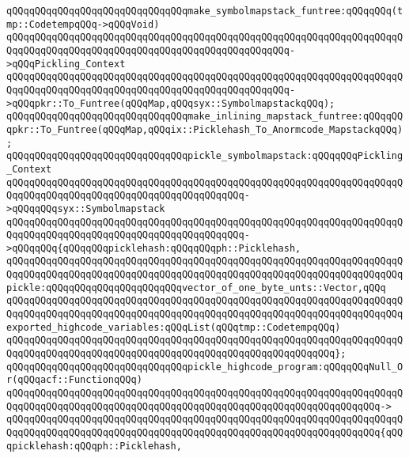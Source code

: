 \verb|qQQqqQQqqQQqqQQqqQQqqQQqqQQqqQQqmake_symbolmapstack_funtree:qQQqqQQq(tmp::CodetempqQQq->qQQqVoid)|\newline
\verb|qQQqqQQqqQQqqQQqqQQqqQQqqQQqqQQqqQQqqQQqqQQqqQQqqQQqqQQqqQQqqQQqqQQqqQQqqQQqqQQqqQQqqQQqqQQqqQQqqQQqqQQqqQQqqQQqqQQqqQQq->qQQqPickling_Context|\newline
\verb|qQQqqQQqqQQqqQQqqQQqqQQqqQQqqQQqqQQqqQQqqQQqqQQqqQQqqQQqqQQqqQQqqQQqqQQqqQQqqQQqqQQqqQQqqQQqqQQqqQQqqQQqqQQqqQQqqQQqqQQq->qQQqpkr::To_Funtree(qQQqMap,qQQqsyx::SymbolmapstackqQQq);|\newline
\newline
\verb|qQQqqQQqqQQqqQQqqQQqqQQqqQQqqQQqmake_inlining_mapstack_funtree:qQQqqQQqpkr::To_Funtree(qQQqMap,qQQqix::Picklehash_To_Anormcode_MapstackqQQq);|\newline
\newline
\verb|qQQqqQQqqQQqqQQqqQQqqQQqqQQqqQQqpickle_symbolmapstack:qQQqqQQqPickling_Context|\newline
\verb|qQQqqQQqqQQqqQQqqQQqqQQqqQQqqQQqqQQqqQQqqQQqqQQqqQQqqQQqqQQqqQQqqQQqqQQqqQQqqQQqqQQqqQQqqQQqqQQqqQQqqQQqqQQqqQQq->qQQqqQQqsyx::Symbolmapstack|\newline
\verb|qQQqqQQqqQQqqQQqqQQqqQQqqQQqqQQqqQQqqQQqqQQqqQQqqQQqqQQqqQQqqQQqqQQqqQQqqQQqqQQqqQQqqQQqqQQqqQQqqQQqqQQqqQQqqQQq->qQQqqQQq{qQQqqQQqpicklehash:qQQqqQQqph::Picklehash,|\newline
\verb|qQQqqQQqqQQqqQQqqQQqqQQqqQQqqQQqqQQqqQQqqQQqqQQqqQQqqQQqqQQqqQQqqQQqqQQqqQQqqQQqqQQqqQQqqQQqqQQqqQQqqQQqqQQqqQQqqQQqqQQqqQQqqQQqqQQqqQQqqQQqpickle:qQQqqQQqqQQqqQQqqQQqqQQqvector_of_one_byte_unts::Vector,qQQq|\newline
\verb|qQQqqQQqqQQqqQQqqQQqqQQqqQQqqQQqqQQqqQQqqQQqqQQqqQQqqQQqqQQqqQQqqQQqqQQqqQQqqQQqqQQqqQQqqQQqqQQqqQQqqQQqqQQqqQQqqQQqqQQqqQQqqQQqqQQqqQQqqQQqexported_highcode_variables:qQQqList(qQQqtmp::CodetempqQQq)|\newline
\verb|qQQqqQQqqQQqqQQqqQQqqQQqqQQqqQQqqQQqqQQqqQQqqQQqqQQqqQQqqQQqqQQqqQQqqQQqqQQqqQQqqQQqqQQqqQQqqQQqqQQqqQQqqQQqqQQqqQQqqQQqqQQqqQQq};|\newline
\newline
\verb|qQQqqQQqqQQqqQQqqQQqqQQqqQQqqQQqpickle_highcode_program:qQQqqQQqNull_Or(qQQqacf::FunctionqQQq)|\newline
\verb|qQQqqQQqqQQqqQQqqQQqqQQqqQQqqQQqqQQqqQQqqQQqqQQqqQQqqQQqqQQqqQQqqQQqqQQqqQQqqQQqqQQqqQQqqQQqqQQqqQQqqQQqqQQqqQQqqQQqqQQqqQQqqQQqqQQqqQQq->|\newline
\verb|qQQqqQQqqQQqqQQqqQQqqQQqqQQqqQQqqQQqqQQqqQQqqQQqqQQqqQQqqQQqqQQqqQQqqQQqqQQqqQQqqQQqqQQqqQQqqQQqqQQqqQQqqQQqqQQqqQQqqQQqqQQqqQQqqQQqqQQq{qQQqpicklehash:qQQqph::Picklehash,|\newline
